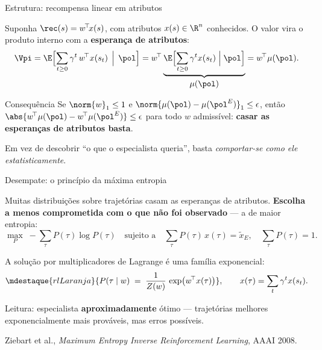 \documentclass[aspectratio=169, 11pt]{beamer}
\newcommand{\polE}{\pol^{E}}                     %
\newcommand{\traj}{\tau}
\begin{document}
\begin{frame}[shrink]{Estrutura: recompensa linear em atributos}

  Suponha $\rec(s) = w^{\!\top}\!x(s)$, com atributos $x(s)\in\R^{n}$ conhecidos.
  O valor vira o produto interno com a \textbf{esperança de atributos}:
  \[
    \Vpi = \E\Bigl[\sum_{t\ge 0}\gamma^{t}\, w^{\!\top} x(s_t) \,\Bigm|\, \pol\Bigr]
      = w^{\!\top} \underbrace{\E\Bigl[\sum_{t\ge 0}\gamma^{t} x(s_t) \Bigm| \pol\Bigr]}_{\textstyle \mu(\pol)}
      = w^{\!\top}\mu(\pol).
  \]

  \begin{teobox}{Consequência}
    Se $\norm{w}_1 \le 1$ e $\norm{\mu(\pol) - \mu(\polE)}_1 \le \epsilon$, então
    $\abs{ w^{\!\top}\mu(\pol) - w^{\!\top}\mu(\polE)} \le \epsilon$ para todo
    $w$ admissível: \textbf{casar as esperanças de atributos basta}.
  \end{teobox}

  \begin{ideiabox}
    Em vez de descobrir ``o que o especialista queria'', basta
    \emph{comportar-se como ele estatisticamente}.
  \end{ideiabox}
\end{frame}

\begin{frame}{Desempate: o princípio da máxima entropia}

  Muitas distribuições sobre trajetórias casam as esperanças de atributos.
  \textbf{Escolha a menos comprometida com o que não foi observado} --- a de
  maior entropia:
  \[
    \max_{P}\; -\sum_{\traj} P(\traj)\log P(\traj)
    \quad\text{sujeito a}\quad
    \sum_{\traj} P(\traj)\, x(\traj) = \tilde{x}_{E},
    \quad \sum_{\traj}P(\traj) = 1 .
  \]

  \pause
  A solução por multiplicadores de Lagrange é uma família exponencial:
  \[
    \mdestaque{rlLaranja}{P(\traj \mid w) \;=\; \frac{1}{Z(w)}\,
      \exp\bigl(w^{\!\top} x(\traj)\bigr)},
    \qquad
    x(\traj) = \sum_{t} \gamma^{t} x(s_t).
  \]

  \begin{ideiabox}
    Leitura: especialista \textbf{aproximadamente} ótimo --- trajetórias
    melhores exponencialmente mais prováveis, mas erros possíveis.
  \end{ideiabox}

  {\scriptsize\color{rlCinza}Ziebart et al., \emph{Maximum Entropy Inverse
  Reinforcement Learning}, AAAI 2008.}
\end{frame}
\end{document}
